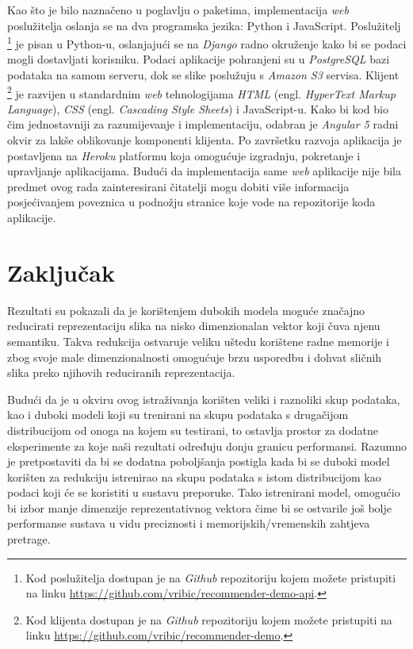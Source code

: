 \documentclass[times, utf8, proizvoljni, numeric]{fer}
\begin{document}
Kao što je bilo naznačeno u poglavlju o paketima, implementacija \textit{web} poslužitelja oslanja se na dva programska jezika: Python i JavaScript. Poslužitelj \footnote{Kod poslužitelja dostupan je na \textit{Github} repozitoriju kojem možete pristupiti na linku \url{https://github.com/vribic/recommender-demo-api}.} je pisan u Python-u, oslanjajući se na \textit{Django} radno okruženje kako bi se podaci mogli dostavljati korisniku. Podaci aplikacije pohranjeni su u \textit{PostgreSQL} bazi podataka na samom serveru, dok se slike poslužuju s \textit{Amazon S3} servisa. Klijent \footnote{Kod klijenta dostupan je na \textit{Github} repozitoriju kojem možete pristupiti na linku \url{https://github.com/vribic/recommender-demo}.} je razvijen u standardnim \textit{web} tehnologijama \textit{HTML} (engl. \textit{HyperText Markup Language}), \textit{CSS} (engl. \textit{Cascading Style Sheets}) i JavaScript-u. Kako bi kod bio čim jednostavniji za razumijevanje i implementaciju, odabran je \textit{Angular 5} radni okvir za lakše oblikovanje komponenti klijenta. Po završetku razvoja aplikacija je postavljena na \textit{Heroku} platformu koja omogućuje izgradnju, pokretanje i upravljanje aplikacijama. Budući da implementacija same \textit{web} aplikacije nije bila predmet ovog rada zainteresirani čitatelji mogu dobiti više informacija posjećivanjem poveznica u podnožju stranice koje vode na repozitorije koda aplikacije.



\chapter{Zaključak}

Rezultati su pokazali da je korištenjem dubokih modela moguće značajno reducirati reprezentaciju slika na nisko dimenzionalan vektor koji čuva njenu semantiku. Takva redukcija ostvaruje veliku uštedu korištene radne memorije i zbog svoje male dimenzionalnosti omogućuje brzu usporedbu i dohvat sličnih slika preko njihovih reduciranih reprezentacija. 

Budući da je u okviru ovog istraživanja korišten veliki i raznoliki skup podataka, kao i duboki modeli koji su trenirani na skupu podataka s drugačijom distribucijom od onoga na kojem su testirani, to ostavlja prostor za dodatne eksperimente za koje naši rezultati određuju donju granicu performansi. Razumno je pretpostaviti da bi se dodatna poboljšanja postigla kada bi se duboki model korišten za redukciju istrenirao na skupu podataka s istom distribucijom kao podaci koji će se koristiti u sustavu preporuke. Tako istrenirani model, omogućio bi izbor manje dimenzije reprezentativnog vektora čime bi se ostvarile još bolje performanse sustava u vidu preciznosti i memorijskih/vremenskih zahtjeva pretrage.
\end{document}
